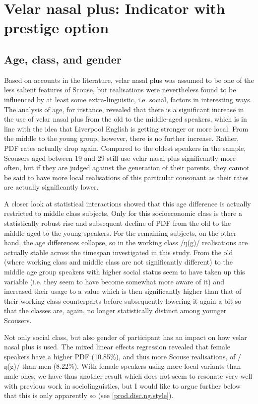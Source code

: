 \section{Velar nasal plus: Indicator with prestige option}
\label{prod.disc.ng}

\subsection{Age, class, and gender}
\label{prod.disc.ng.social}

Based on accounts in the literature, velar nasal plus was assumed to be one of the less salient features of Scouse, but realisations were nevertheless found to be influenced by at least some extra-linguistic, i.e. social, factors in interesting ways.
The analysis of age, for instance, revealed that there is a significant increase in the use of velar nasal plus from the old to the middle-aged speakers, which is in line with the idea that Liverpool English is getting stronger or more local.
From the middle to the young group, however, there is no further increase.
Rather, PDF rates actually drop again.
Compared to the oldest speakers in the sample, Scousers aged between 19 and 29 still use velar nasal plus significantly more often, but if they are judged against the generation of their parents, they cannot be said to have more local realisations of this particular consonant as their rates are actually significantly lower.

A closer look at statistical interactions showed that this age difference is actually restricted to middle class subjects.
Only for this socioeconomic class is there a statistically robust rise and subsequent decline of PDF from the old to the middle-aged to the young speakers.
For the remaining subjects, on the other hand, the age differences collapse, so in the working class /ŋ(g)/ realisations are actually stable across the timespan investigated in this study.
From the old (where working class and middle class are not significantly different) to the middle age group speakers with higher social status seem to have taken up this variable (i.e. they seem to have become somewhat more aware of it) and increased their usage to a value which is then significantly higher than that of their working class counterparts before subsequently lowering it again a bit so that the classes are, again, no longer statistically distinct among younger Scousers.

Not only social class, but also gender of participant has an impact on how velar nasal plus is used.
The mixed linear effects regression revealed that female speakers have a higher PDF (10.85\%), and thus more Scouse realisations, of /ŋ(g)/ than men (8.22\%).
With female speakers using more local variants than male ones, we have thus another result which does not seem to resonate very well with previous work in sociolinguistics, but I would like to argue further below that this is only apparently so (see \ref{prod.disc.ng.style}).

